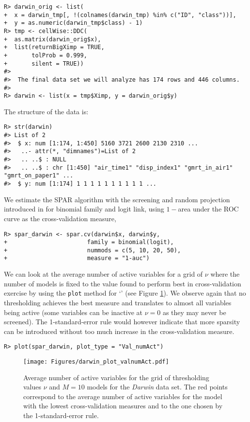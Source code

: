 \documentclass[
  article]{jss}
\newcommand{\class}[1]{`\code{#1}'}
\begin{document}
\begin{verbatim}
R> darwin_orig <- list(
+  x = darwin_tmp[, !(colnames(darwin_tmp) %in% c("ID", "class"))],
+  y = as.numeric(darwin_tmp$class) - 1)
R> tmp <- cellWise::DDC(
+  as.matrix(darwin_orig$x),
+  list(returnBigXimp = TRUE, 
+       tolProb = 0.999,
+       silent = TRUE))
#>  
#>  The final data set we will analyze has 174 rows and 446 columns.
#> 
R> darwin <- list(x = tmp$Ximp, y = darwin_orig$y)
\end{verbatim}

The structure of the data is:

\begin{verbatim}
R> str(darwin)
#> List of 2
#>  $ x: num [1:174, 1:450] 5160 3721 2600 2130 2310 ...
#>   ..- attr(*, "dimnames")=List of 2
#>   .. ..$ : NULL
#>   .. ..$ : chr [1:450] "air_time1" "disp_index1" "gmrt_in_air1" "gmrt_on_paper1" ...
#>  $ y: num [1:174] 1 1 1 1 1 1 1 1 1 1 ...
\end{verbatim}

We estimate the SPAR algorithm with the screening and random projection
introduced in \citet{parzer2024glms} for binomial family and logit link,
using \(1-\)area under the ROC curve as the cross-validation measure,

\begin{verbatim}
R> spar_darwin <- spar.cv(darwin$x, darwin$y,
+                       family = binomial(logit),
+                       nummods = c(5, 10, 20, 50),
+                       measure = "1-auc")
\end{verbatim}

We can look at the average number of active variables for a grid of
\(\nu\) where the number of models is fixed to the value found to
perform best in cross-validation exercise by using the \texttt{plot}
method for \class{spar.cv} (see Figure \ref{fig:darwin_activevars}). We
observe again that no thresholding achieves the best measure and
translates to almost all variables being active (some variables can be
inactive at \(\nu=0\) as they may never be screened). The
1-standard-error rule would however indicate that more sparsity can be
introduced without too much increase in the cross-validation measure.

\begin{verbatim}
R> plot(spar_darwin, plot_type = "Val_numAct")
\end{verbatim}

\begin{figure}[t!]
\centering
\texttt{[image: Figures/darwin\_plot\_valnumAct.pdf]}
\caption{Average number of active variables for the grid of thresholding values 
$\nu$ and $M=10$ models for the \emph{Darwin} data set. The red points correspond to the average number of active variables for the model with the lowest cross-validation measures and to the one chosen by the 1-standard-error rule. \label{fig:darwin_activevars}}
\end{figure}
\end{document}
